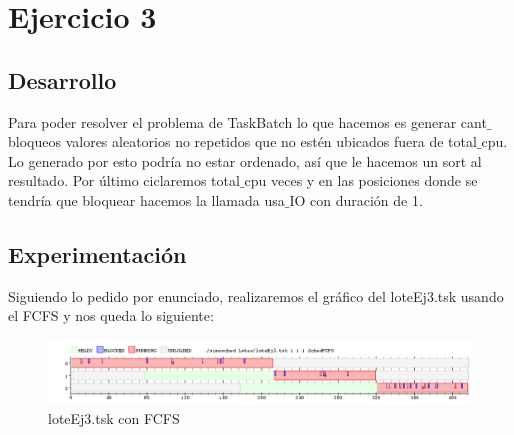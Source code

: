 
\section{Ejercicio 3}

\subsection{Desarrollo}
Para poder resolver el problema de TaskBatch lo que hacemos es generar cant$\_$bloqueos valores aleatorios no repetidos que no estén ubicados fuera de total$\_$cpu. 
Lo generado por esto podría no estar ordenado, así que le hacemos un sort al resultado. Por último ciclaremos total$\_$cpu veces y en las posiciones donde se tendría que 
bloquear hacemos la llamada usa$\_$IO con duración de 1.

\subsection{Experimentación}
Siguiendo lo pedido por enunciado, realizaremos el gráfico del loteEj3.tsk usando el FCFS y nos queda lo siguiente:

\begin{figure}[H]
  \centering
    \includegraphics[width=1.1\textwidth]{imagenes/BatchExperimento.png}
  \caption{loteEj3.tsk con FCFS}
\end{figure}